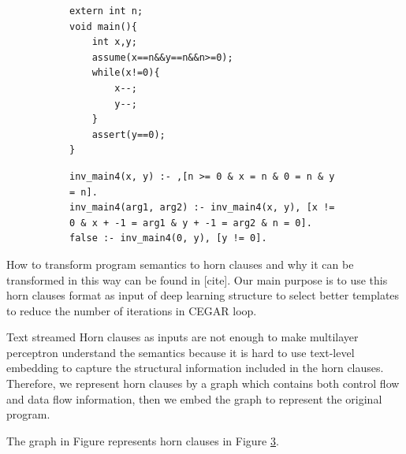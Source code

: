 \documentclass{article}
\begin{document}
\begin{figure}[h]
\begin{subfigure}[b]{0.4\textwidth}
\begin{lstlisting}
extern int n;
void main(){
    int x,y;
    assume(x==n&&y==n&&n>=0);
    while(x!=0){
        x--;
        y--;
    }
    assert(y==0);
}
\end{lstlisting}\label{while-C-program}
\end{subfigure}
\begin{subfigure}[b]{0.6\textwidth}
\begin{lstlisting}
inv_main4(x, y) :- ,[n >= 0 & x = n & 0 = n & y = n].
inv_main4(arg1, arg2) :- inv_main4(x, y), [x != 0 & x + -1 = arg1 & y + -1 = arg2 & n = 0].
false :- inv_main4(0, y), [y != 0].
\end{lstlisting}\label{while-C-horn-clauses}
  \end{subfigure}
  \caption{}
\end{figure}

How to transform program semantics to horn clauses and why it can be transformed in this way can be found in [cite]. Our main purpose is to use this horn clauses format as input of deep learning structure to select better templates to reduce the number of iterations in CEGAR loop.

Text streamed Horn clauses as inputs are not enough to make multilayer perceptron understand the semantics because it is hard to use text-level embedding to capture the structural information included in the horn clauses. Therefore, we represent horn clauses by a graph which contains both control flow and data flow information, then we embed the graph to represent the original program.

The graph in Figure represents horn clauses in Figure \ref{while-C-horn-clauses}.
\end{document}
